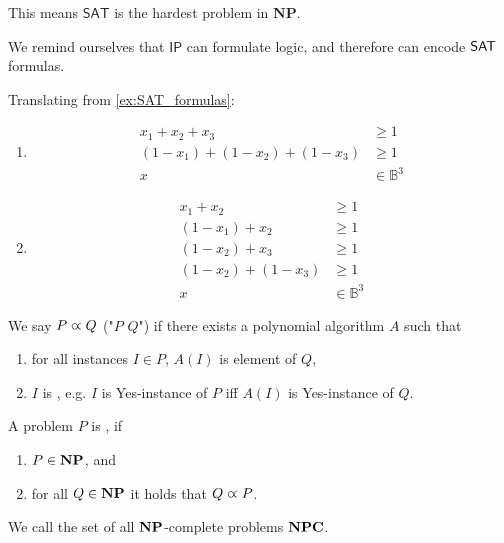 
This means $\mathsf{SAT}$ is the hardest problem in $\mathbf{NP}$.

We remind ourselves that $\mathsf{IP}$ can formulate logic, and therefore can encode
$\mathsf{SAT}$ formulas.
\begin{example}
    Translating from \autoref{ex:SAT_formulas}:
    \begin{enumerate}
        \item
              \begin{align*}
                  x_1 + x_2 + x_3             & \geq 1           \\
                  (1-x_1) + (1-x_2) + (1-x_3) & \geq 1           \\
                  x                           & \in \mathbb{B}^3
              \end{align*}
        \item
              \begin{align*}
                  x_1 + x_2         & \geq 1           \\
                  (1-x_1) + x_2     & \geq 1           \\
                  (1-x_2) + x_3     & \geq 1           \\
                  (1-x_2) + (1-x_3) & \geq 1           \\
                  x                 & \in \mathbb{B}^3
              \end{align*}
    \end{enumerate}
\end{example}
\begin{definition}[Reduction]
    We say $P \varpropto Q$ ("$P$  $Q$") if there exists a polynomial algorithm $A$
    such that
    \begin{enumerate}
        \item for all instances $I \in P$, $A(I)$ is element of $Q$,
        \item $I$ is , e.g. $I$ is Yes-instance of $P$ iff $A(I)$ is Yes-instance of $Q$.
    \end{enumerate}
\end{definition}
\begin{definition}[$\NP$-complete]
    A problem $P$ is , if
    \begin{enumerate}
        \item $P \in \mathbf{NP}$, and
        \item for all $Q \in \mathbf{NP}$ it holds that $Q \varpropto P$.
    \end{enumerate}
    We call the set of all $\NP$-complete problems $\mathbf{NPC}$.
\end{definition}
